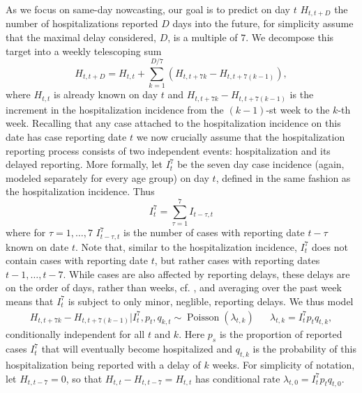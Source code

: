 As we focus on same-day nowcasting, our goal is to predict on day $t$ $H^{}_{t, t + D}$ the number of hospitalizations reported $D$ days into the future, for simplicity assume that the maximal delay considered, $D$, is a multiple of $7$. We decompose this target into a weekly telescoping sum 
$$
    H^{}_{t, t + D} = H^{}_{t, t} + \sum_{k = 1} ^{D / 7} (H^{}_{t, t + 7k} - H_{t, t + 7 ( k - 1)}),
$$
where $H_{t,t}$ is already known on day $t$ and $H_{t, t + 7k} - H_{t, t + 7 ( k - 1)}$ is the increment in the hospitalization incidence from the $(k-1)$-st week to the $k$-th week. Recalling that any case attached to the hospitalization incidence on this date has case reporting date $t$ we now crucially assume that the hospitalization reporting process consists of two independent events: hospitalization and its delayed reporting.
More formally, let $I^{7}_{t}$ be the seven day case incidence (again, modeled separately for every age group) on day $t$, defined in the same fashion as the hospitalization incidence. Thus 
$$
    I^{7}_t = \sum_{\tau = 1}^{7} I^{}_{t - \tau, t}
$$
where for $\tau = 1, \dots, 7$ $I^{7}_{t - \tau, t}$ is the number of cases with reporting date $t - \tau$ known on date $t$. Note that, similar to the hospitalization incidence, $I^{7}_t$ does not contain cases with reporting date $t$, but rather cases with reporting dates $t - 1, \dots, t - 7$. While cases are also affected by reporting delays, these delays are on the order of days, rather than weeks, cf. , and averaging over the past week means that $I^{7}_t$ is subject to only minor, neglible, reporting delays. We thus model 
\begin{align}
    \label{eq:hosp_increment_distribution}
    H_{t, t + 7k} - H^{}_{t, t + 7 ( k - 1)} | I^{7}_t, p^{}_{t}, q^{}_{k,t} \sim \operatorname{Poisson} \left( \lambda^{}_{t,k} \right) && \lambda^{}_{t,k} = I^{7}_{t} p^{}_{t} q^{}_{t, k},
\end{align}
conditionally independent for all $t$ and $k$.
Here $p^{}_s$ is the proportion of reported cases $I^{7}_{t}$ that will eventually become hospitalized and $q^{}_{t,k}$ is the probability of this hospitalization being reported with a delay of $k$ weeks.
For simplicity of notation, let $H_{t, t - 7} = 0$, so that $H_{t,t} - H_{t, t- 7} = H_{t,t}$ has conditional rate $\lambda_{t,0} = I^{7}_t p_{t}q_{t,0}$.

